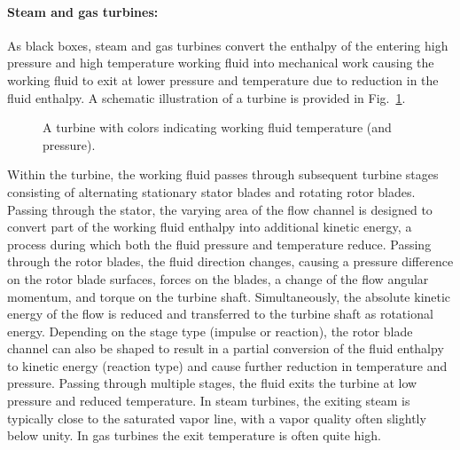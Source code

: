 \begin{example}
\begin{center}
    \end{center}
\end{example}

\paragraph{Steam and gas turbines:} As black boxes, steam and gas turbines convert the enthalpy of the entering high pressure and high temperature working fluid into mechanical work causing the working fluid to exit at lower pressure and temperature due to reduction in the fluid enthalpy. A schematic illustration of a turbine is provided in Fig.~\ref{fig:turbine}.
\begin{figure}[!htb]
    \centering
    
    \caption{A turbine with colors indicating working fluid temperature (and pressure).}
    \label{fig:turbine}
\end{figure}

Within the turbine, the working fluid passes through subsequent turbine stages consisting of alternating stationary stator blades and rotating rotor blades. Passing through the stator, the varying area of the flow channel is designed to convert part of the working fluid enthalpy into additional kinetic energy, a process during which both the fluid pressure and temperature reduce. Passing through the rotor blades, the fluid direction changes, causing a pressure difference on the rotor blade surfaces, forces on the blades, a change of the flow angular momentum, and torque on the turbine shaft. Simultaneously, the absolute kinetic energy of the flow is reduced and transferred to the turbine shaft as rotational energy. Depending on the stage type (impulse or reaction), the rotor blade channel can also be shaped to result in a partial conversion of the fluid enthalpy to kinetic energy (reaction type) and cause further reduction in temperature and pressure. Passing through multiple stages, the fluid exits the turbine at low pressure and reduced temperature. In steam turbines, the exiting steam is typically close to the saturated vapor line, with a vapor quality often slightly below unity. In gas turbines the exit temperature is often quite high. 


